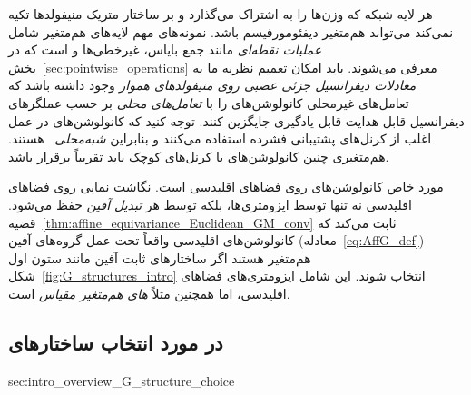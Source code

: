هر لایه شبکه که وزن‌ها را به اشتراک می‌گذارد و بر ساختار متریک منیفولدها تکیه نمی‌کند می‌تواند هم‌متغیر دیفئومورفیسم باشد.
نمونه‌های مهم لایه‌های هم‌متغیر  شامل \emph{عملیات نقطه‌ای} مانند جمع بایاس، غیرخطی‌ها و \onexone است که در بخش~\ref{sec:pointwise_operations} معرفی می‌شوند.
باید امکان تعمیم نظریه ما به \emph{معادلات دیفرانسیل جزئی عصبی روی منیفولدهای هموار} وجود داشته باشد که تعامل‌های غیرمحلی کانولوشن‌های \lr{$\GM$} را با \emph{تعامل‌های محلی} بر حسب عملگرهای دیفرانسیل قابل هدایت  قابل یادگیری جایگزین کنند.
توجه کنید که کانولوشن‌های \lr{$\GM$} در عمل اغلب از کرنل‌های پشتیبانی فشرده استفاده می‌کنند و بنابراین \emph{شبه‌محلی}~\cite{tomboulis2015nonlocal} هستند.
هم‌متغیری  چنین کانولوشن‌های \lr{$\GM$} با کرنل‌های کوچک باید تقریباً برقرار باشد.


مورد خاص کانولوشن‌های \lr{$\GM$} روی فضاهای اقلیدسی است.
نگاشت نمایی روی فضاهای اقلیدسی نه تنها توسط ایزومتری‌ها، بلکه توسط هر \emph{تبدیل آفین} حفظ می‌شود.
قضیه~\ref{thm:affine_equivariance_Euclidean_GM_conv} ثابت می‌کند که کانولوشن‌های \lr{$\GM$} اقلیدسی واقعاً تحت عمل گروه‌های آفین  (معادله~\eqref{eq:AffG_def}) هم‌متغیر هستند اگر ساختارهای  ثابت آفین مانند ستون اول شکل~\ref{fig:G_structures_intro} انتخاب شوند.
این شامل ایزومتری‌های  فضاهای اقلیدسی، اما همچنین مثلاً \emph{های هم‌متغیر مقیاس} است.



















\toclesslab\subsection{در مورد انتخاب ساختارهای }{sec:intro_overview_G_structure_choice}

